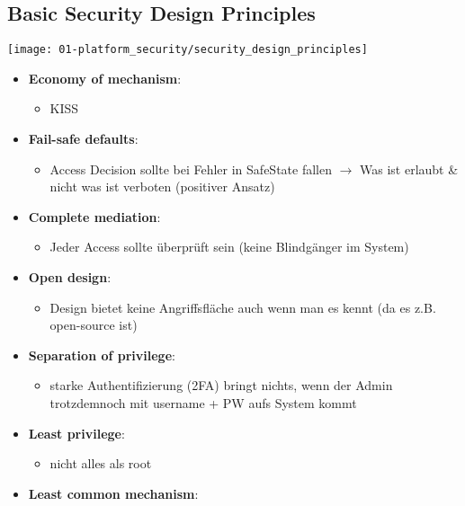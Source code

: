 \subsection{Basic Security Design Principles}
\begin{center}
    \vspace{-8pt}
    \texttt{[image: 01-platform\_security/security\_design\_principles]}
    \vspace{-8pt}
\end{center}

\begin{itemize}
    \item \textbf{Economy of mechanism}:
    \begin{itemize}
        \item KISS
    \end{itemize}
    \item \textbf{Fail-safe defaults}: 
    \begin{itemize}
        \item Access Decision sollte bei Fehler in Safe\-State fallen $\rightarrow$ Was ist erlaubt \& nicht was ist verboten (positiver Ansatz)
    \end{itemize}
    \item \textbf{Complete mediation}: 
    \begin{itemize}
        \item Jeder Access sollte überprüft sein (keine Blindgänger im System)
    \end{itemize}
    \item \textbf{Open design}: 
    \begin{itemize}
        \item Design bietet keine Angriffsfläche auch wenn man es kennt (da es z.B. open-source ist)
    \end{itemize}
    \item \textbf{Separation of privilege}:
    \begin{itemize}
        \item starke Authentifizierung (2FA) bringt nichts, wenn der Admin trotzdemnoch mit username + PW aufs System kommt
    \end{itemize}
    \item \textbf{Least privilege}: 
    \begin{itemize}
        \item nicht alles als root
    \end{itemize}
    \item \textbf{Least common mechanism}: 

\end{itemize}
